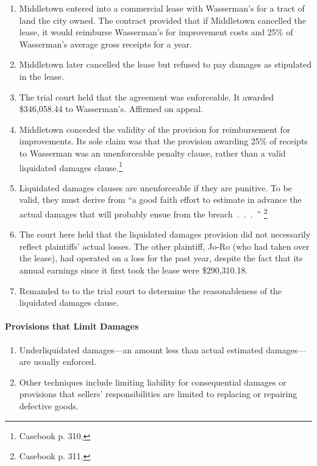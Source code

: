 \begin{enumerate}
    \item Middletown entered into a commercial lease with Wasserman's for a 
    tract of land the city owned. The contract provided that if Middletown 
    cancelled the lease, it would reimburse Wasserman's for improvement costs 
    and 25\% of Wasserman's average gross receipts for a year.
    \item Middletown later cancelled the lease but refused to pay damages as 
    stipulated in the lease.
    \item The trial court held that the agreement was enforceable. It awarded 
    \$346,058.44 to Wasserman's. Affirmed on appeal.
    \item Middletown conceded the validity of the provision for reimbursement 
    for improvements. Its sole claim was that the provision awarding 25\% of 
    receipts to Wasserman was an unenforceable penalty clause, rather than a 
    valid liquidated damages clause.\footnote{Casebook p. 310.}
    \item Liquidated damages clauses are unenforceable if they are punitive. 
    To be valid, they must derive from ``a good faith effort to estimate in 
    advance the actual damages that will probably ensue from the 
    breach~.~.~.~'' \footnote{Casebook p. 311.}
    \item The court here held that the liquidated damages provision did not 
    necessarily reflect plaintiffs' actual losses. The other plaintiff, Jo-Ro 
    (who had taken over the lease), had operated on a loss for the past year, 
    despite the fact that its annual earnings since it first took the lease 
    were \$290,310.18.
    \item Remanded to to the trial court to determine the reasonableness of 
    the liquidated damages clause.
\end{enumerate}

\paragraph{Provisions that Limit Damages}

\begin{enumerate}
    \item Underliquidated damages---an amount less than actual estimated 
    damages---are usually enforced.
    \item Other techniques include limiting liability for consequential 
    damages or provisions that sellers' responsibilities are limited to 
    replacing or repairing defective goods.
\end{enumerate}

